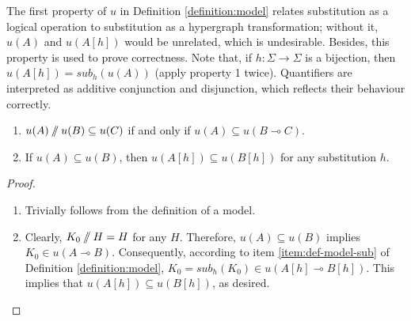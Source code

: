 \documentclass[a4paper,UKenglish,cleveref, autoref, thm-restate,pdfa]{lipics-v2021}
\newcommand{\limpl}{\multimap}
\newcommand{\pc}{\mathbin{/\mkern-6mu/}}
\newcommand{\sub}{\mathit{sub}}
\begin{document}
The first property of $u$ in Definition \ref{definition:model} relates substitution as a logical operation to substitution as a hypergraph transformation; without it, $u(A)$ and $u(A[h])$ would be unrelated, which is undesirable. Besides, this property is used to prove correctness. Note that, if $h:\Sigma \to \Sigma$ is a bijection, then $u(A[h]) = \sub_h(u(A))$ (apply property 1 twice). Quantifiers are interpreted as additive conjunction and disjunction, which reflects their behaviour correctly. 
\begin{lemma}\label{lemma:val-sub-monotone}
	\leavevmode
	\begin{enumerate}
		\item $u(A) \pc u(B) \subseteq u(C)$ if and only if $u(A) \subseteq u(B \limpl C)$.
		\item If $u(A) \subseteq u(B)$, then $u(A[h]) \subseteq u(B[h])$ for any substitution $h$.
	\end{enumerate}
\end{lemma}
\begin{proof}
	\begin{enumerate}
		\item Trivially follows from the definition of a model.
		\item Clearly, $K_0 \pc H = H$ for any $H$. Therefore, $u(A) \subseteq u(B)$ implies $K_0 \in u(A \limpl B)$. Consequently, according to item \ref{item:def-model-sub} of Definition \ref{definition:model}, $K_0 = \sub_h(K_0) \in u(A[h] \limpl B[h])$. This implies that $u(A[h]) \subseteq u(B[h])$, as desired. \qedhere
	\end{enumerate}
\end{proof}
\end{document}
